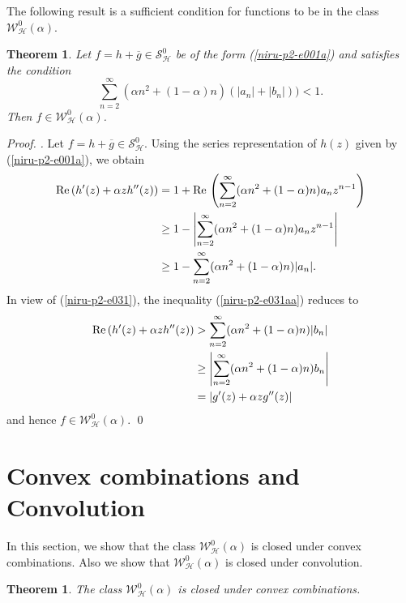 \documentclass[a4paper,12pt]{amsart}
\theoremstyle{plain}
\newtheorem{thm}[equation]{Theorem}
\theoremstyle{definition}
\newenvironment{pf}[1][]{ \vskip 3mm
 \noindent
 \ifthenelse{\equal{#1}{}}  {{\slshape Proof. }}  {{\slshape #1.} } }{\qed\bigskip}
\begin{document}
\newpage
The following result is a sufficient condition for functions to be in the class $\mathcal{W}^0_{\mathcal{H}}(\alpha)$.
\begin{thm}
Let $f = h + \overline{g} \in \mathcal{S}^0_{\mathcal{H}}$ be of the form (\ref{niru-p2-e001a}) and satisfies the condition
\begin{equation}\label{niru-p2-e031}
\sum_{n =2}^{\infty}(\alpha n^2 + (1 - \alpha) n)(|a_n| + |b_n|)) < 1.
\end{equation}
Then $f\in\mathcal{W}^0_{\mathcal{H}}(\alpha)$.
\end{thm}

\begin{pf} Let $f=h+\overline{g}\in \mathcal{S}^0_{\mathcal{H}}$. Using the series representation of $h(z)$ given by (\ref{niru-p2-e001a}), we obtain
\begin{align}\label{niru-p2-e031aa}
{\rm Re\,}(h'(z) + \alpha z h''(z)) & = 1 + {\rm Re\,}\left(\sum_{n=2}^{\infty} (\alpha n^2 + (1 - \alpha) n) a_n z^{n-1}\right)\\\nonumber
& \geq 1 - \left|\sum_{n=2}^{\infty} (\alpha n^2 + (1 - \alpha) n) a_n z^{n-1}\right|\\\nonumber
& \geq 1 - \sum_{n=2}^{\infty}(\alpha n^2 + (1 - \alpha) n)|a_n|.
\end{align}
In view of (\ref{niru-p2-e031}), the inequality (\ref{niru-p2-e031aa})  reduces to
\begin{align*}
{\rm Re\,}(h'(z) + \alpha z h''(z)) & > \sum_{n=2}^{\infty}(\alpha n^2 + (1 - \alpha) n)|b_n|\\
& \geq \left|\sum_{n=2}^{\infty}(\alpha n^2 + (1 - \alpha) n)b_n \right|\\
& =|g'(z) + \alpha z g''(z)|
\end{align*}
and hence $f\in\mathcal{W}^0_{\mathcal{H}}(\alpha)$.
\end{pf}

\section{Convex combinations and Convolution}
In this section, we show that the class $\mathcal{W}^0_{\mathcal{H}}(\alpha)$ is closed  under convex combinations. Also we show that $\mathcal{W}^0_{\mathcal{H}}(\alpha)$ is closed under  convolution.

\begin{thm}
The class $\mathcal{W}^0_{\mathcal{H}}(\alpha)$ is closed under convex combinations.
\end{thm}
\end{document}
